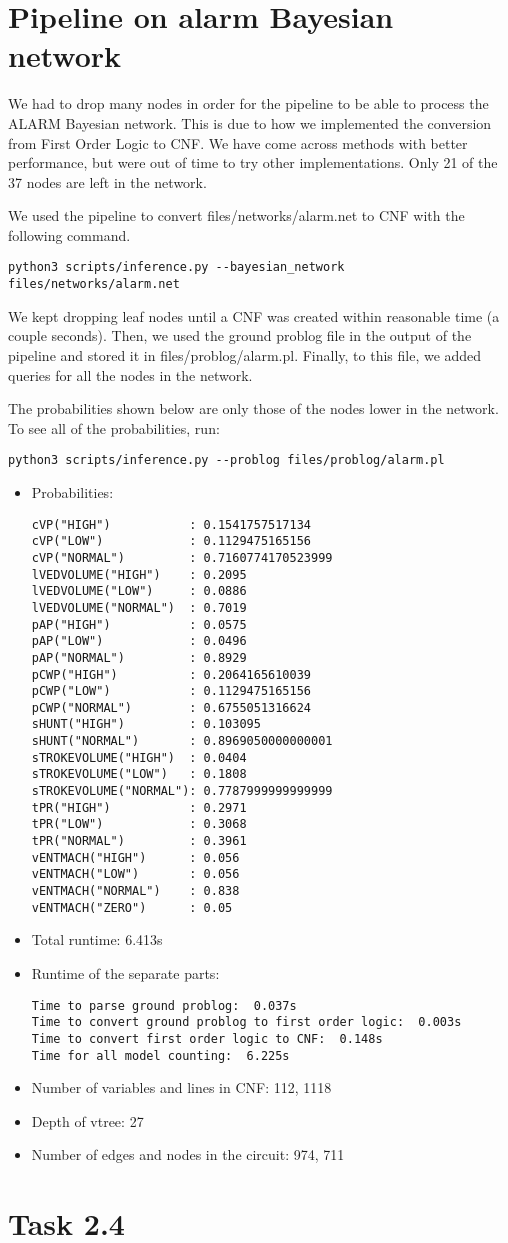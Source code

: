 \section{Pipeline on alarm Bayesian network}
We had to drop many nodes in order for the pipeline to be able to process the ALARM Bayesian network. This is due to how we implemented the conversion from First Order Logic to CNF. We have come across methods with better performance, but were out of time to try other implementations. Only 21 of the 37 nodes are left in the network.

We used the pipeline to convert files/networks/alarm.net to CNF with the following command.
\begin{lstlisting}
python3 scripts/inference.py --bayesian_network files/networks/alarm.net
\end{lstlisting}
We kept dropping leaf nodes until a CNF was created within reasonable time (a couple seconds). Then, we used the ground problog file in the output of the pipeline and stored it in files/problog/alarm.pl. Finally, to this file, we added queries for all the nodes in the network.

The probabilities shown below are only those of the nodes lower in the network. To see all of the probabilities, run:
\begin{lstlisting}
python3 scripts/inference.py --problog files/problog/alarm.pl
\end{lstlisting}
\begin{itemize}
    \item Probabilities:
    \begin{lstlisting}
cVP("HIGH")           : 0.1541757517134
cVP("LOW")            : 0.1129475165156
cVP("NORMAL")         : 0.7160774170523999
lVEDVOLUME("HIGH")    : 0.2095
lVEDVOLUME("LOW")     : 0.0886
lVEDVOLUME("NORMAL")  : 0.7019
pAP("HIGH")           : 0.0575
pAP("LOW")            : 0.0496
pAP("NORMAL")         : 0.8929
pCWP("HIGH")          : 0.2064165610039
pCWP("LOW")           : 0.1129475165156
pCWP("NORMAL")        : 0.6755051316624
sHUNT("HIGH")         : 0.103095
sHUNT("NORMAL")       : 0.8969050000000001
sTROKEVOLUME("HIGH")  : 0.0404
sTROKEVOLUME("LOW")   : 0.1808
sTROKEVOLUME("NORMAL"): 0.7787999999999999
tPR("HIGH")           : 0.2971
tPR("LOW")            : 0.3068
tPR("NORMAL")         : 0.3961
vENTMACH("HIGH")      : 0.056
vENTMACH("LOW")       : 0.056
vENTMACH("NORMAL")    : 0.838
vENTMACH("ZERO")      : 0.05
    \end{lstlisting}
    \item Total runtime: 6.413s
    \item Runtime of the separate parts:
    \begin{lstlisting}
Time to parse ground problog:  0.037s
Time to convert ground problog to first order logic:  0.003s
Time to convert first order logic to CNF:  0.148s
Time for all model counting:  6.225s
    \end{lstlisting}
    \item Number of variables and lines in CNF: 112, 1118
    \item Depth of vtree: 27
    \item Number of edges and nodes in the circuit: 974, 711
\end{itemize}

\section{Task 2.4}
